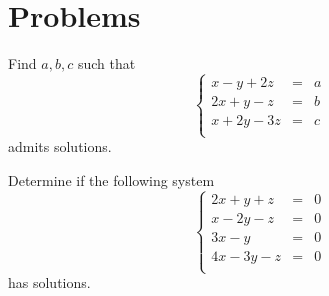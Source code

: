 \section{Problems}

\begin{Pb}
Find $a,b,c$ such that 
\[ \left\{ 
\begin{array}{ccc} 
x - y + 2z & = & a \\
2x +y -z & = & b \\
x+ 2y -3z & = & c \\
\end{array}
\right.
\]
admits solutions.
\end{Pb}

\begin{Pb}
Determine if the following system
\[ \left\{ 
\begin{array}{ccc} 
2x +y +z & = & 0 \\
x-2y-z & = & 0 \\
3x-y & = & 0 \\
4x -3y -z & = & 0 \\
\end{array}
\right.
\]
has solutions.
\end{Pb}

